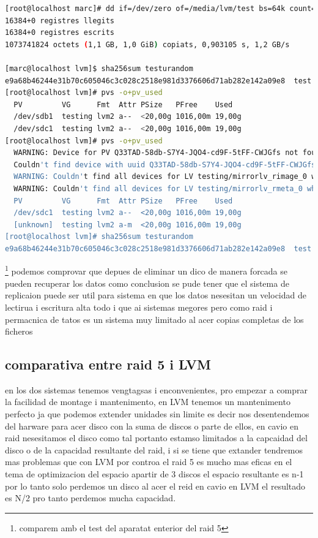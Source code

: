 \documentclass[preprint,11pt]{elsarticle}
\begin{document}
\begin{lstlisting}[basicstyle=\tiny, language=bash]
[root@localhost marc]# dd if=/dev/zero of=/media/lvm/test bs=64k count=16k conv=fdatasync
16384+0 registres llegits
16384+0 registres escrits
1073741824 octets (1,1 GB, 1,0 GiB) copiats, 0,903105 s, 1,2 GB/s

[marc@localhost lvm]$ sha256sum testurandom 
e9a68b46244e31b70c605046c3c028c2518e981d3376606d71ab282e142a09e8  test
[root@localhost lvm]# pvs -o+pv_used
  PV         VG      Fmt  Attr PSize   PFree    Used  
  /dev/sdb1  testing lvm2 a--  <20,00g 1016,00m 19,00g
  /dev/sdc1  testing lvm2 a--  <20,00g 1016,00m 19,00g
[root@localhost lvm]# pvs -o+pv_used
  WARNING: Device for PV Q33TAD-58db-S7Y4-JQO4-cd9F-5tFF-CWJGfs not found or rejected by a filter.
  Couldn't find device with uuid Q33TAD-58db-S7Y4-JQO4-cd9F-5tFF-CWJGfs.
  WARNING: Couldn't find all devices for LV testing/mirrorlv_rimage_0 while checking used and assumed devices.
  WARNING: Couldn't find all devices for LV testing/mirrorlv_rmeta_0 while checking used and assumed devices.
  PV         VG      Fmt  Attr PSize   PFree    Used  
  /dev/sdc1  testing lvm2 a--  <20,00g 1016,00m 19,00g
  [unknown]  testing lvm2 a-m  <20,00g 1016,00m 19,00g
[root@localhost lvm]# sha256sum testurandom 
e9a68b46244e31b70c605046c3c028c2518e981d3376606d71ab282e142a09e8  test

\end{lstlisting}\footnote{comparem amb el test del aparatat enterior del raid 5}
podemos comprovar que depues de eliminar un dico de manera forcada se pueden recuperar los datos como conclusion se pude tener que el sistema de replicaion puede ser util para sistema en que los datos nesesitan un velocidad de lectirua i escritura alta todo i que ai sistemas megores pero como raid i permacnica de tatos es un sistema muy limitado al acer copias completas de los ficheros

\subsection{comparativa entre raid 5 i LVM}

en los dos sistemas tenemos vengtagsas i enconvenientes, pro empezar a comprar la facilidad de montage i mantenimento, en LVM tenemos un mantenimento perfecto ja que podemos extender unidades sin limite es decir nos desentendemos del harware para acer disco con la suma de discos o parte de ellos, en cavio en raid nesesitamos el disco como tal portanto estamso limitados a la capcaidad del disco o de la capacidad resultante del raid, i si se tiene que extander tendremos mas problemas que con LVM por controa el raid 5 es mucho mas eficas en el tema de optimizacion del espacio  apartir de 3 discos el espacio resultante es n-1 por lo tanto solo perdemos un disco al acer el reid en cavio en LVM el resultado es N/2 pro tanto perdemos mucha capacidad.\smallskip
\end{document}
